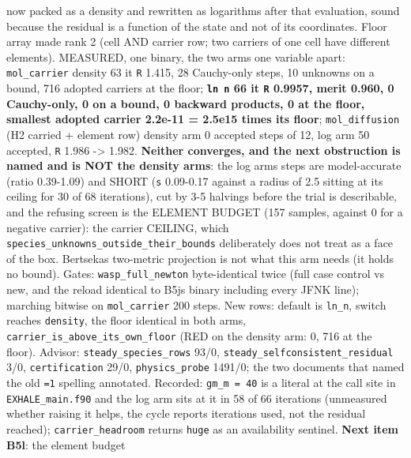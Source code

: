 \documentclass[english,a4paper]{my_memo}
\begin{document}
\begin{itemize}
  now packed as a density and rewritten as logarithms after that
  evaluation, sound because the residual is a function of the state and
  not of its coordinates. Floor array made rank 2 (cell AND carrier row;
  two carriers of one cell have different elements). MEASURED, one binary,
  the two arms one variable apart: \texttt{mol\_carrier} density 63 it \texttt{\textbar{}\textbar{}R\textbar{}\textbar{}}
  1.415, 28 Cauchy-only steps, 10 unknowns on a bound, 716 adopted
  carriers at the floor; \textbf{\texttt{ln\ n} 66 it \texttt{\textbar{}\textbar{}R\textbar{}\textbar{}} 0.9957, merit 0.960, 0
  Cauchy-only, 0 on a bound, 0 backward products, 0 at the floor, smallest
  adopted carrier 2.2e-11 = 2.5e15 times its floor}; \texttt{mol\_diffusion} (H2
  carried + element row) density arm 0 accepted steps of 12, log arm 50
  accepted, \texttt{\textbar{}\textbar{}R\textbar{}\textbar{}} 1.986 -\textgreater{} 1.982. \textbf{Neither converges, and the next
  obstruction is named and is NOT the density arm\textquotesingle s}: the log arm\textquotesingle s steps
  are model-accurate (ratio 0.39-1.09) and SHORT (\texttt{\textbar{}\textbar{}s\textbar{}\textbar{}} 0.09-0.17 against
  a radius of 2.5 sitting at its ceiling for 30 of 68 iterations), cut by
  3-5 halvings before the trial is describable, and the refusing screen is
  the ELEMENT BUDGET (157 samples, against 0 for a negative carrier): the
  carrier CEILING, which \texttt{species\_unknowns\_outside\_their\_bounds}
  deliberately does not treat as a face of the box. Bertsekas\textquotesingle{} two-metric
  projection is not what this arm needs (it holds no bound). Gates:
  \texttt{wasp\_full\_newton} byte-identical twice (full case control vs new, and
  the reload identical to B5j\textquotesingle s binary including every JFNK line); marching
  bitwise on \texttt{mol\_carrier} 200 steps. New rows: default is \texttt{ln\_n}, switch
  reaches \texttt{density}, the floor identical in both arms,
  \texttt{carrier\_is\_above\_its\_own\_floor} (RED on the density arm: 0, 716 at the
  floor). Advisor: \texttt{steady\_species\_rows} 93/0, \texttt{steady\_selfconsistent\_residual}
  3/0, \texttt{certification} 29/0, \texttt{physics\_probe} 1491/0; the two documents that
  named the old \texttt{=1} spelling annotated. Recorded: \texttt{gm\_m\ =\ 40} is a literal
  at the call site in \texttt{EXHALE\_main.f90} and the log arm sits at it in 58 of
  66 iterations (unmeasured whether raising it helps, the cycle reports
  iterations used, not the residual reached); \texttt{carrier\_headroom} returns
  \texttt{huge} as an availability sentinel. \textbf{Next item B5l}: the element budget

\end{itemize}
\end{document}
